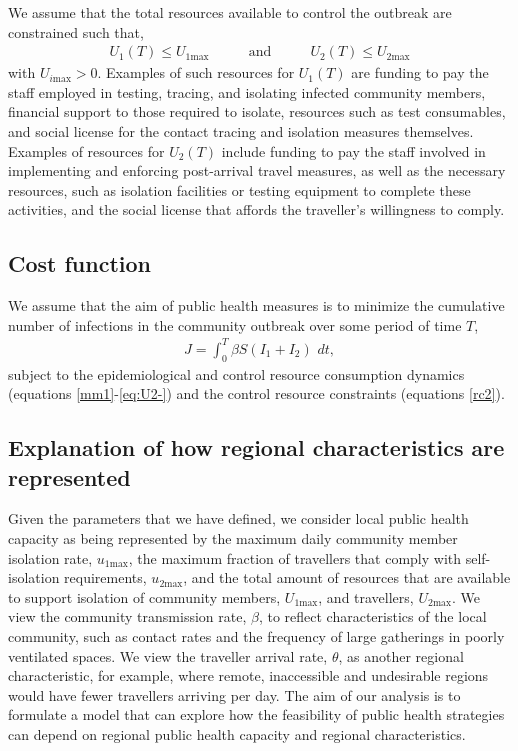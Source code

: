 \documentclass[pdflatex]{sn-jnl}
\theoremstyle{thmstyleone}%
\theoremstyle{thmstyletwo}%
\theoremstyle{thmstylethree}%
\begin{document}
We assume that the total resources available to control the outbreak are constrained such that,
%
\begin{eqnarray}
   U_{1}(T) \leq U_{1\text{max}} & \qquad \mbox{and} \qquad & U_{2}(T) \leq U_{2\text{max}} \label{rc2}
\end{eqnarray}
%
with $U_{i\text{max}}>0$. Examples of such resources for $U_{1}(T)$ are funding to pay the staff employed in testing, tracing, and isolating infected community members, financial support to those required to isolate, resources such as test consumables, and social license for the contact tracing and isolation measures themselves. Examples of resources for $U_{2}(T)$ include funding to pay the staff involved in implementing and enforcing post-arrival travel measures, as well as the necessary resources, such as isolation facilities or testing equipment to complete these activities, and the social license that affords the traveller's willingness to comply.

\subsection{Cost function}\label{sec:cost}
We assume that the aim of public health measures is to minimize the cumulative number of infections in the community outbreak over some period of time $T$,
%
\begin{align}
    J = \int_0^{T} \beta S(I_{1} +  I_{2}) \,\, dt, \label{obj}
\end{align}
%
subject to the epidemiological and control resource consumption dynamics (equations \eqref{mm1}-\eqref{eq:U2-}) and the control resource constraints (equations \eqref{rc2}).

\subsection{Explanation of how regional characteristics are represented}
Given the parameters that we have defined, we consider local public health capacity as being represented by the maximum daily community member isolation rate, $u_{1\text{max}}$, the maximum fraction of travellers that comply with self-isolation requirements, $ u_{2\text{max}}$, and the total amount of resources that are available to support isolation of community members, $U_{1\text{max}}$, and travellers, $U_{2\text{max}}$. We view the community transmission rate, $\beta$, to reflect characteristics of the local community, such as contact rates and the frequency of large gatherings in poorly ventilated spaces. We view the traveller arrival rate, $\theta$, as another regional characteristic, for example, where remote, inaccessible and undesirable regions would have fewer travellers arriving per day. The aim of our analysis is to formulate a model that can explore how the feasibility of public health strategies can depend on regional public health capacity and regional characteristics.
\end{document}
